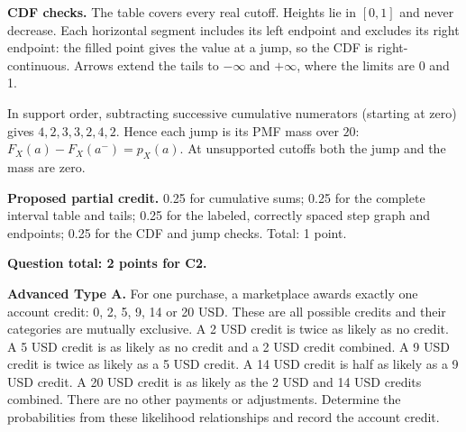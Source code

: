 \begin{center}\end{center}

\textbf{CDF checks.} The table covers every real cutoff. Heights lie in $[0,1]$ and never decrease. Each horizontal segment includes its left endpoint and excludes its right endpoint: the filled point gives the value at a jump, so the CDF is right-continuous. Arrows extend the tails to $-\infty$ and $+\infty$, where the limits are 0 and 1.

In support order, subtracting successive cumulative numerators (starting at zero) gives $4,2,3,3,2,4,2$. Hence each jump is its PMF mass over $20$: $F_X(a)-F_X(a^-)=p_X(a)$. At unsupported cutoffs both the jump and the mass are zero.

\textbf{Proposed partial credit.} 0.25 for cumulative sums; 0.25 for the complete interval table and tails; 0.25 for the labeled, correctly spaced step graph and endpoints; 0.25 for the CDF and jump checks. Total: 1 point.

\par\vspace{3mm}\secInicio[][sec:q4]

\textbf{Question total: 2 points for C2.}

\clearpage
{}

\textbf{Advanced Type A.} For one purchase, a marketplace awards exactly one account credit: 0, 2, 5, 9, 14 or 20 USD. These are all possible credits and their categories are mutually exclusive. A 2 USD credit is twice as likely as no credit. A 5 USD credit is as likely as no credit and a 2 USD credit combined. A 9 USD credit is twice as likely as a 5 USD credit. A 14 USD credit is half as likely as a 9 USD credit. A 20 USD credit is as likely as the 2 USD and 14 USD credits combined. There are no other payments or adjustments. Determine the probabilities from these likelihood relationships and record the account credit.

